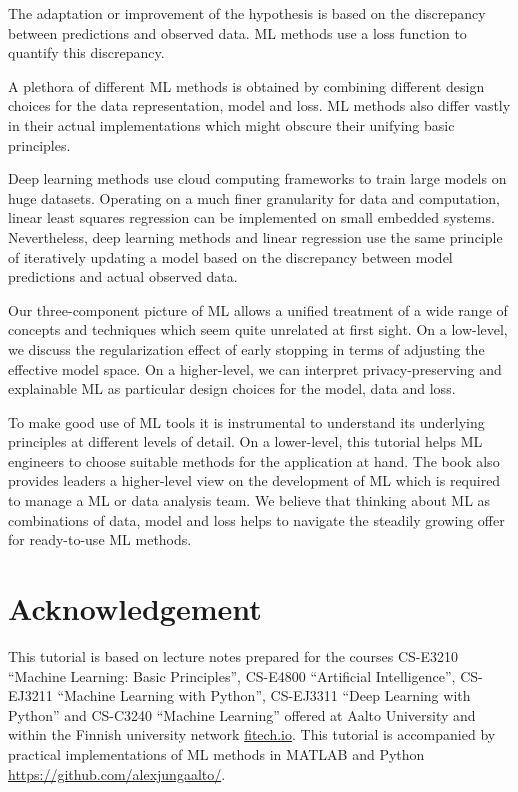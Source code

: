 \documentclass[12pt]{report}
\begin{document}
The adaptation or improvement of the hypothesis is based on the discrepancy 
between predictions and observed data. ML methods use a loss function 
to quantify this discrepancy.

A plethora of different ML methods is obtained by combining different design 
choices for the data representation, model and loss. ML methods also differ 
vastly in their actual implementations which might obscure their unifying 
basic principles. 

Deep learning methods use cloud computing frameworks to train large 
models on huge datasets. Operating on a much finer granularity for 
data and computation, linear least squares regression can be implemented 
on small embedded systems. Nevertheless, deep learning methods and 
linear regression use the same principle of iteratively updating a model 
based on the discrepancy between model predictions and actual observed 
data. 

Our three-component picture of ML allows a unified treatment of a 
wide range of concepts and techniques which seem quite unrelated 
at first sight. On a low-level, we discuss the regularization effect of 
early stopping in terms of adjusting the effective model space. On a 
higher-level, we can interpret privacy-preserving and explainable ML as 
particular design choices for the model, data and loss. 

To make good use of ML tools it is instrumental to understand 
its underlying principles at different levels of detail. On a lower-level, 
this tutorial helps ML engineers to choose suitable methods for 
the application at hand. The book also provides leaders a 
higher-level view on the development of ML which is required 
to manage a ML or data analysis team. We believe that thinking 
about ML as combinations of data, model and loss helps to navigate 
the steadily growing offer for ready-to-use ML methods. 

\section*{Acknowledgement}
This tutorial is based on lecture notes prepared for the 
courses CS-E3210 ``Machine Learning: Basic Principles'', 
CS-E4800 ``Artificial Intelligence'', CS-EJ3211 ``Machine 
Learning with Python'', CS-EJ3311 ``Deep Learning with Python'' 
and CS-C3240 ``Machine Learning'' offered at Aalto 
University and within the Finnish university network 
\url{fitech.io}. This tutorial is accompanied by practical 
implementations of ML methods in MATLAB and 
Python \url{https://github.com/alexjungaalto/}. 
\end{document}

